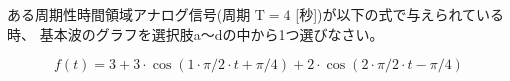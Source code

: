 ある周期性時間領域アナログ信号(周期 $\textrm{T} = 4$ [秒])が以下の式で与えられている時、
基本波のグラフを選択肢a〜dの中から1つ選びなさい。

\[
f(t) = 
3
+ 3 \cdot \cos( 1 \cdot \pi/2 \cdot t + \pi/4)
+ 2 \cdot \cos( 2 \cdot \pi/2 \cdot t -\pi/4 )
\]
